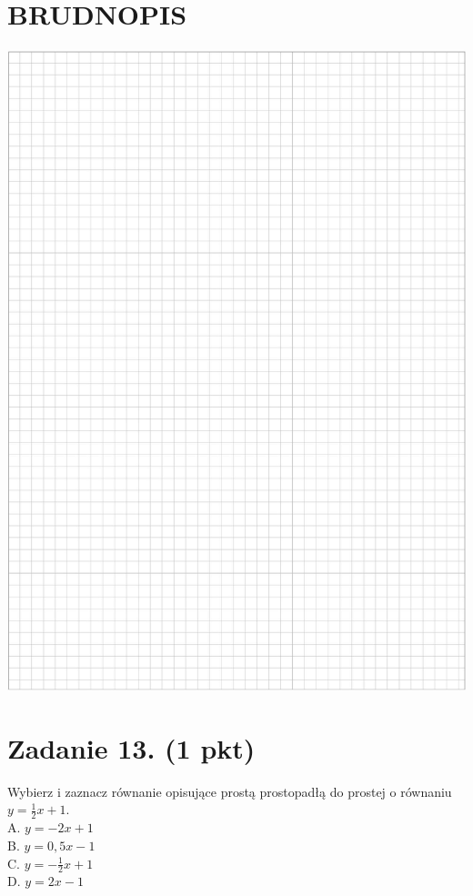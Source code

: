\documentclass[10pt]{article}
\begin{document}
\section*{BRUDNOPIS}
\begin{center}
\includegraphics[max width=\textwidth]{2024_11_21_3a102e13f4b06a61f46fg-05}
\end{center}

\section*{Zadanie 13. (1 pkt)}
Wybierz i zaznacz równanie opisujące prostą prostopadłą do prostej o równaniu \(y=\frac{1}{2} x+1\).\\
A. \(y=-2 x+1\)\\
B. \(y=0,5 x-1\)\\
C. \(y=-\frac{1}{2} x+1\)\\
D. \(y=2 x-1\)
\end{document}
